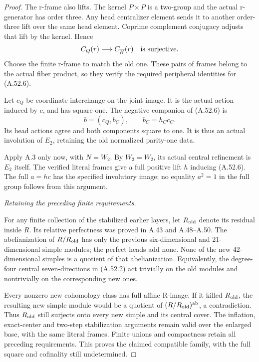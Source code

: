 \begin{proof}
The r-frame also lifts. The kernel \(P\times P\)
is a two-group and the actual r-generator has
order three. Any head centralizer element sends
it to another order-three lift over the same
head element. Coprime complement conjugacy
adjusts that lift by the kernel. Hence
\[
                C_Q(r)\longrightarrow
                C_{\overline H}(r)
                \quad\hbox{is surjective}.
\]
Choose the finite r-frame to match the old one.
These pairs of frames belong to the actual
fiber product, so they verify the required
peripheral identities for (A.52.6).

Let \(c_Q\) be coordinate interchange on the
joint image. It is the actual action induced
by \(c\), and has square one. The negative
companion of (A.52.6) is
\[
                      b=(c_Q,b_C),\qquad b_C=h_Cc_C.
                                                               \tag{A.52.7}
\]
Its head actions agree and both components
square to one. It is thus an actual involution
of \(E_2\), retaining the old normalized
parity-one data.

Apply A.3 only now, with \(N=W_2\).
By \(W_3=W_2\), its actual central refinement
is \(E_2\) itself. The verified literal frames
give a full positive lift \(h\) inducing
(A.52.6). The full \(a=hc\) has the specified
involutory image; no equality \(a^2=1\) in the
full group follows from this argument.

\emph{Retaining the preceding finite requirements.}\par
For any finite collection of the stabilized
earlier layers, let \(R_{\rm old}\) denote its
residual inside \(R\). Its relative perfectness
was proved in A.43 and A.48--A.50. The
abelianization of \(R/R_{\rm old}\) has only
the previous six-dimensional and 21-dimensional
simple modules; the perfect heads add none.
None of the new 42-dimensional simples is a
quotient of that abelianization. Equivalently,
the degree-four central seven-directions in
(A.52.2) act trivially on the old modules and
nontrivially on the corresponding new ones.

Every nonzero new cohomology class has full
affine R-image. If it killed \(R_{\rm old}\),
the resulting new simple module would be a
quotient of \((R/R_{\rm old})^{\rm ab}\),
a contradiction. Thus \(R_{\rm old}\) still
surjects onto every new simple and its central
cover. The inflation, exact-center and two-step
stabilization arguments remain valid over the
enlarged base, with the same literal frames.
Finite unions and compactness retain all
preceding requirements. This proves the claimed
compatible family, with the full square and
cofinality still undetermined.
\end{proof}

